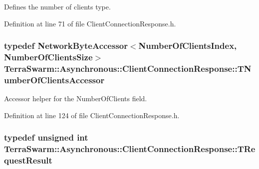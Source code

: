 Defines the number of clients type. 



Definition at line 71 of file Client\-Connection\-Response.\-h.

\hypertarget{class_terra_swarm_1_1_asynchronous_1_1_client_connection_response_a6740a3389ab57cb4968a15ecf405fd8e}{
\subsubsection[{T\-Number\-Of\-Clients\-Accessor}]{\setlength{\rightskip}{0pt plus 5cm}typedef {\bf Network\-Byte\-Accessor}$<${\bf Number\-Of\-Clients\-Index}, {\bf Number\-Of\-Clients\-Size}$>$ {\bf Terra\-Swarm\-::\-Asynchronous\-::\-Client\-Connection\-Response\-::\-T\-Number\-Of\-Clients\-Accessor}\hspace{0.3cm}{\ttfamily [private]}}}\label{class_terra_swarm_1_1_asynchronous_1_1_client_connection_response_a6740a3389ab57cb4968a15ecf405fd8e}


Accessor helper for the Number\-Of\-Clients field. 



Definition at line 124 of file Client\-Connection\-Response.\-h.

\hypertarget{class_terra_swarm_1_1_asynchronous_1_1_client_connection_response_a55a4d4527b877bde0e74da223157a62a}{
\subsubsection[{T\-Request\-Result}]{\setlength{\rightskip}{0pt plus 5cm}typedef unsigned int {\bf Terra\-Swarm\-::\-Asynchronous\-::\-Client\-Connection\-Response\-::\-T\-Request\-Result}}}\label{class_terra_swarm_1_1_asynchronous_1_1_client_connection_response_a55a4d4527b877bde0e74da223157a62a}


